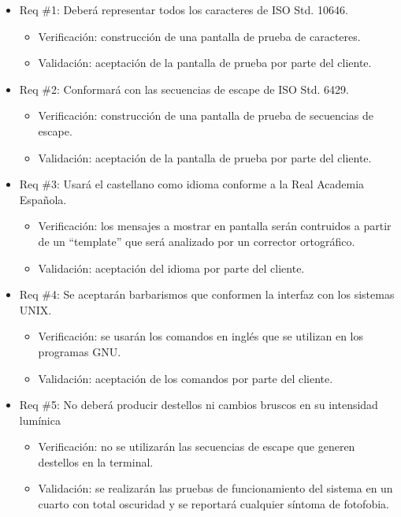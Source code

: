 \documentclass[
11pt, %
]{charter}
\begin{document}
\begin{itemize} 
\item Req \#1: Deberá representar todos los caracteres de ISO Std. 10646.
\begin{itemize}
	\item Verificación: construcción de una pantalla de prueba de caracteres.
	\item Validación: aceptación de la pantalla de prueba por parte del cliente.  
\end{itemize}

\item Req \#2: Conformará con las secuencias de escape de ISO Std. 6429.
\begin{itemize}
    \item Verificación: construcción de una pantalla de prueba de secuencias de escape.
    \item Validación: aceptación de la pantalla de prueba por parte del cliente.
\end{itemize}

\item Req \#3: Usará el castellano como idioma conforme a la Real Academia Española.
\begin{itemize}
    \item Verificación: los mensajes a mostrar en pantalla serán contruidos a partir de un ``template'' que será analizado por un corrector ortográfico.
    \item Validación: aceptación del idioma por parte del cliente.
\end{itemize}

\item Req \#4: Se aceptarán barbarismos que conformen la interfaz con los sistemas UNIX.
\begin{itemize}
    \item Verificación: se usarán los comandos en inglés que se utilizan en los programas GNU.
    \item Validación: aceptación de los comandos por parte del cliente.
\end{itemize}

\item Req \#5: No deberá producir destellos ni cambios bruscos en su intensidad lumínica
\begin{itemize}
    \item Verificación: no se utilizarán las secuencias de escape que generen destellos en la terminal.
    \item Validación: se realizarán las pruebas de funcionamiento del sistema en un cuarto con total oscuridad y se reportará cualquier síntoma de fotofobia.
\end{itemize}


\end{itemize}
\end{document}
